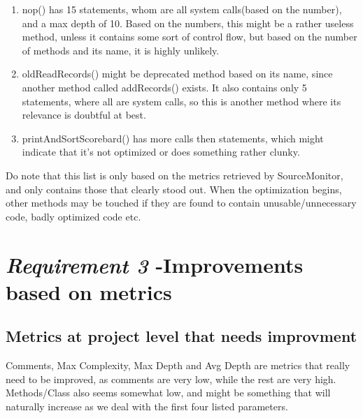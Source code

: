 \documentclass{article}
\begin{document}
\begin{enumerate}
\begin{enumerate}
\item
nop() has 15 statements, whom are all system calls(based on the number), and a max depth
of 10. Based on the numbers, this might be a rather useless method, unless it contains
some sort of control flow, but based on the number of methods and its name, it is highly unlikely.

\item
oldReadRecords() might be deprecated method based on its name, since another method called addRecords() exists. It also contains only 5 statements, where all are system calls, so this is another method where its relevance is doubtful at best.

\item
printAndSortScorebard() has more calls then statements, which might indicate that it's not optimized or does something rather clunky.

\end{enumerate}

Do note that this list is only based on the metrics retrieved by SourceMonitor, and only contains those that clearly stood out. When the optimization begins, other methods may be touched if they are found to contain unusable/unnecessary code, badly optimized code etc.

\end{enumerate}
\section{\textit{Requirement 3} -Improvements based on metrics}

\subsection{Metrics at project level that needs improvment}
Comments, Max Complexity, Max Depth and Avg Depth are metrics that really need to be improved, as comments are very low, while the rest are very high. Methods/Class also seems somewhat low, and might be something that will naturally increase as we deal with the first four listed parameters.
\end{document}
